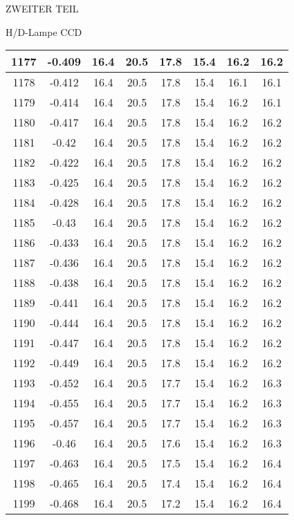 \begin{appendix}
\begin{chapter}{ZWEITER TEIL}
\begin{section}{H/D-Lampe CCD}
\begin{scriptsize}
\begin{longtable}[htbp]{|c|c|c|c|c|c|c|c|}
            1177 & -0.409 & 16.4 & 20.5 & 17.8 & 15.4 & 16.2 & 16.2 \\ \hline
            1178 & -0.412 & 16.4 & 20.5 & 17.8 & 15.4 & 16.1 & 16.1 \\ \hline
            1179 & -0.414 & 16.4 & 20.5 & 17.8 & 15.4 & 16.2 & 16.1 \\ \hline
            1180 & -0.417 & 16.4 & 20.5 & 17.8 & 15.4 & 16.2 & 16.2 \\ \hline
            1181 & -0.42 & 16.4 & 20.5 & 17.8 & 15.4 & 16.2 & 16.2 \\ \hline
            1182 & -0.422 & 16.4 & 20.5 & 17.8 & 15.4 & 16.2 & 16.2 \\ \hline
            1183 & -0.425 & 16.4 & 20.5 & 17.8 & 15.4 & 16.2 & 16.2 \\ \hline
            1184 & -0.428 & 16.4 & 20.5 & 17.8 & 15.4 & 16.2 & 16.2 \\ \hline
            1185 & -0.43 & 16.4 & 20.5 & 17.8 & 15.4 & 16.2 & 16.2 \\ \hline
            1186 & -0.433 & 16.4 & 20.5 & 17.8 & 15.4 & 16.2 & 16.2 \\ \hline
            1187 & -0.436 & 16.4 & 20.5 & 17.8 & 15.4 & 16.2 & 16.2 \\ \hline
            1188 & -0.438 & 16.4 & 20.5 & 17.8 & 15.4 & 16.2 & 16.2 \\ \hline
            1189 & -0.441 & 16.4 & 20.5 & 17.8 & 15.4 & 16.2 & 16.2 \\ \hline
            1190 & -0.444 & 16.4 & 20.5 & 17.8 & 15.4 & 16.2 & 16.2 \\ \hline
            1191 & -0.447 & 16.4 & 20.5 & 17.8 & 15.4 & 16.2 & 16.2 \\ \hline
            1192 & -0.449 & 16.4 & 20.5 & 17.8 & 15.4 & 16.2 & 16.2 \\ \hline
            1193 & -0.452 & 16.4 & 20.5 & 17.7 & 15.4 & 16.2 & 16.3 \\ \hline
            1194 & -0.455 & 16.4 & 20.5 & 17.7 & 15.4 & 16.2 & 16.3 \\ \hline
            1195 & -0.457 & 16.4 & 20.5 & 17.7 & 15.4 & 16.2 & 16.3 \\ \hline
            1196 & -0.46 & 16.4 & 20.5 & 17.6 & 15.4 & 16.2 & 16.3 \\ \hline
            1197 & -0.463 & 16.4 & 20.5 & 17.5 & 15.4 & 16.2 & 16.4 \\ \hline
            1198 & -0.465 & 16.4 & 20.5 & 17.4 & 15.4 & 16.2 & 16.4 \\ \hline
            1199 & -0.468 & 16.4 & 20.5 & 17.2 & 15.4 & 16.2 & 16.4 \\ \hline

\end{longtable}
\end{scriptsize}
\end{section}
\end{chapter}
\end{appendix}

